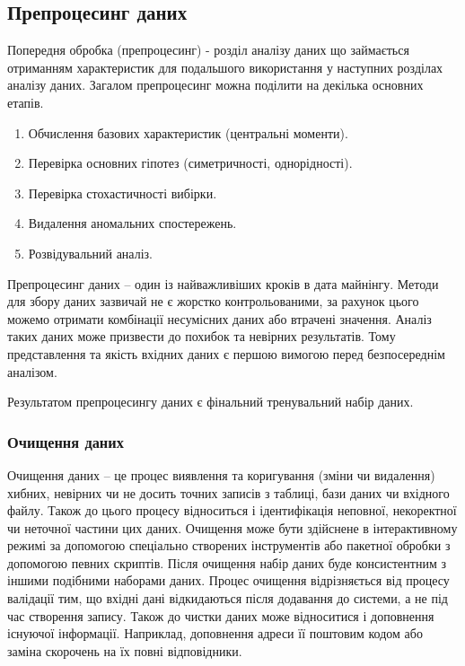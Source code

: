 \subsection{Препроцесинг даних}
Попередня обробка (препроцесинг) - розділ аналізу даних що займається отриманням характеристик для подальшого використання у наступних розділах аналізу даних. Загалом препроцесинг можна поділити на декілька основних етапів.
\begin{enumerate}  
	\item Обчислення базових характеристик (центральні моменти).
	\item Перевірка основних гіпотез (симетричності, однорідності).
	\item Перевірка стохастичності вибірки.
	\item Видалення аномальних спостережень.
	\item Розвідувальний аналіз.
\end{enumerate}

Препроцесинг даних – один із найважливіших кроків в дата майнінгу. Методи для збору даних зазвичай не є жорстко контрольованими, за рахунок цього можемо отримати комбінації несумісних даних або втрачені значення. Аналіз таких даних може призвести до похибок та невірних результатів. Тому представлення та якість вхідних даних є першою вимогою перед безпосереднім аналізом.

Результатом препроцесингу даних є фінальний тренувальний набір даних.

\subsubsection{Очищення даних}
Очищення даних – це процес виявлення та коригування (зміни чи видалення) хибних, невірних чи не досить точних записів з таблиці, бази даних чи вхідного файлу. Також до цього процесу відноситься і ідентифікація неповної, некоректної чи неточної частини цих даних. Очищення може бути здійснене в інтерактивному режимі за допомогою спеціально створених інструментів або пакетної обробки з допомогою певних скриптів.  Після очищення набір даних буде консистентним з іншими подібними наборами даних. Процес очищення відрізняється від процесу валідації тим, що вхідні дані відкидаються після додавання до системи, а не під час створення запису. Також до чистки даних може відноситися і доповнення існуючої інформації. Наприклад, доповнення адреси її поштовим кодом або заміна скорочень на їх повні відповідники.

